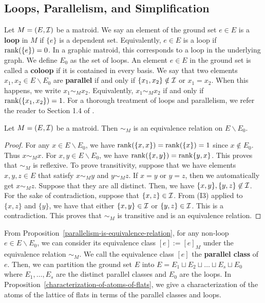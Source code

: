 \documentclass{puthesis-UG}
\begin{document}
\subsection{Loops, Parallelism, and Simplification} \label{sec:loops-parallel-simple}

Let $M = (E, \mathcal{I})$ be a matroid. We say an element of the ground set $e \in E$ is a \textbf{loop} in $M$ if $\{e\}$ is a dependent set. Equivalently, $e \in E$ is a loop if $\operatorname{rank} (\{e\}) = 0$. In a graphic matroid, this corresponds to a loop in the underlying graph. We define $E_0$ as the set of loops. An element $e \in E$ in the ground set is called a \textbf{coloop} if it is contained in every basis. We say that two elements $x_1, x_2 \in E \backslash E_0$ are \textbf{parallel} if and only if $\{x_1, x_2\} \notin \mathcal{I}$ or $x_1 = x_2$. When this happens, we write $x_1 \sim_M x_2$. Equivalently, $x_1 \sim_M x_2$ if and only if $\operatorname{rank} (\{x_1, x_2\}) = 1$. For a thorough treatment of loops and parallelism, we refer the reader to Section 1.4 of \cite{welsh}.

\begin{prop} \label{parallelism-is-equivalence-relation}
	Let $M = (E, \mathcal{I})$ be a matroid. Then $\sim_M$ is an equivalence relation on $E \backslash E_0$. 
\end{prop}

\begin{proof}
	For any $x \in E \backslash E_0$, we have $\operatorname{rank} (\{x, x\}) = \operatorname{rank} (\{x\}) = 1$ since $x \notin E_0$. Thus $x \sim_M x$. For $x, y \in E \backslash E_0$, we have $\operatorname{rank} (\{x, y\}) = \operatorname{rank} \{y, x\}$. This proves that $\sim_M$ is reflexive. To prove transitivity, suppose that we have elements $x, y, z \in E$ that satisfy $x \sim_M y$ and $y \sim_M z$. If $x = y$ or $y = z$, then we automatically get $x \sim_M z$. Suppose that they are all distinct. Then, we have $\{x, y\}, \{y, z\} \not\in \mathcal{I}$. For the sake of contradiction, suppose that $\{x, z\} \in \mathcal{I}$. From (I3) applied to $\{x, z\}$ and $\{y\}$, we have that either $\{x, y\} \in \mathcal{I}$ or $\{y, z\} \in \mathcal{I}$. This is a contradiction. This proves that $\sim_M$ is transitive and is an equivalence relation. 
\end{proof}

From Proposition~\ref{parallelism-is-equivalence-relation}, for any non-loop $e \in E \backslash E_0$, we can consider its equivalence class $[e] := [e]_M$ under the equivalence relation $\sim_M$. We call the equivalence class $[e]$ the \textbf{parallel class} of $e$. Then, we can partition the ground set $E$ into $E = E_1 \sqcup E_2 \sqcup \ldots \sqcup E_s \sqcup E_0$ where $E_1, \ldots, E_s$ are the distinct parallel classes and $E_0$ are the loops. In Proposition~\ref{characterization-of-atoms-of-flats}, we give a characterization of the atoms of the lattice of flats in terms of the parallel classes and loops. 
\end{document}

